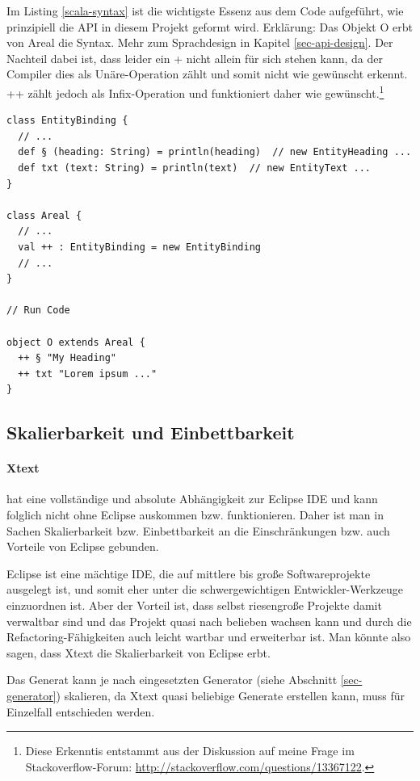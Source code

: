 Im Listing \ref{scala-syntax} ist die wichtigste Essenz aus dem Code
aufgeführt, wie prinzipiell die API in diesem Projekt geformt wird.
Erklärung: Das Objekt O erbt von Areal die Syntax.
Mehr zum Sprachdesign in Kapitel \ref{sec-api-design}.
Der Nachteil dabei ist,
dass leider ein + nicht allein für sich stehen kann, da der Compiler dies
als Unäre-Operation zählt und somit nicht wie gewünscht erkennt. ++ zählt jedoch
als Infix-Operation und funktioniert daher wie gewünscht.\footnote{
Diese Erkenntis entstammt aus der Diskussion auf meine Frage im Stackoverflow-Forum:
\url{http://stackoverflow.com/questions/13367122}.}

\begin{lstlisting}[label=scala-syntax,caption=Scala DSL Syntax und Bindung an API.]
class EntityBinding {
  // ...
  def § (heading: String) = println(heading)  // new EntityHeading ...
  def txt (text: String) = println(text)  // new EntityText ...
}

class Areal {
  // ...
  val ++ : EntityBinding = new EntityBinding
  // ...
}

// Run Code

object O extends Areal {
  ++ § "My Heading"
  ++ txt "Lorem ipsum ..."
}
\end{lstlisting}

\subsection{Skalierbarkeit und Einbettbarkeit}\label{sec-scalierEinbett}

\paragraph{Xtext} hat eine vollständige und absolute Abhängigkeit
zur Eclipse IDE und kann folglich nicht ohne Eclipse auskommen bzw.
funktionieren. Daher ist man in Sachen Skalierbarkeit bzw. Einbettbarkeit
an die Einschränkungen bzw. auch Vorteile von Eclipse gebunden.

Eclipse ist eine mächtige IDE, die auf mittlere bis große Softwareprojekte
ausgelegt ist, und somit eher unter die schwergewichtigen Entwickler-Werkzeuge
einzuordnen ist. Aber der Vorteil ist, dass selbst riesengroße Projekte
damit verwaltbar sind und das Projekt quasi nach belieben wachsen kann und
durch die Refactoring-Fähigkeiten auch leicht wartbar und erweiterbar ist.
Man könnte also sagen, dass Xtext die Skalierbarkeit von Eclipse erbt.

Das Generat kann je nach eingesetzten Generator (siehe Abschnitt
\ref{sec-generator}) skalieren, da Xtext quasi beliebige Generate erstellen
kann, muss für Einzelfall entschieden werden.

